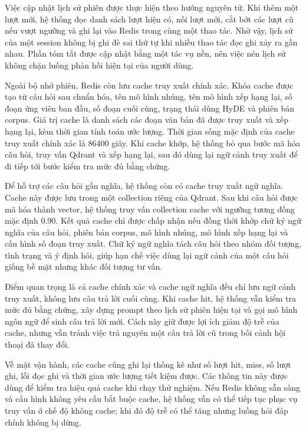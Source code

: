 \documentclass[a4paper,13pt,twoside]{report}
\begin{document}
Việc cập nhật lịch sử phiên được thực hiện theo hướng nguyên tử. Khi thêm một lượt mới, hệ thống đọc danh sách lượt hiện có, nối lượt mới, cắt bớt các lượt cũ nếu vượt ngưỡng và ghi lại vào Redis trong cùng một thao tác. Nhờ vậy, lịch sử của một session không bị ghi đè sai thứ tự khi nhiều thao tác đọc ghi xảy ra gần nhau. Phần tóm tắt được cập nhật bằng một tác vụ nền, nên việc nén lịch sử không chặn luồng phản hồi hiện tại của người dùng.

Ngoài bộ nhớ phiên, Redis còn lưu cache truy xuất chính xác. Khóa cache được tạo từ câu hỏi sau chuẩn hóa, tên mô hình nhúng, tên mô hình xếp hạng lại, số đoạn ứng viên ban đầu, số đoạn cuối cùng, trạng thái dùng HyDE và phiên bản corpus. Giá trị cache là danh sách các đoạn văn bản đã được truy xuất và xếp hạng lại, kèm thời gian tính toán ước lượng. Thời gian sống mặc định của cache truy xuất chính xác là 86400 giây. Khi cache khớp, hệ thống bỏ qua bước mã hóa câu hỏi, truy vấn Qdrant và xếp hạng lại, sau đó dùng lại ngữ cảnh truy xuất để đi tiếp tới bước kiểm tra mức đủ bằng chứng.

Để hỗ trợ các câu hỏi gần nghĩa, hệ thống còn có cache truy xuất ngữ nghĩa. Cache này được lưu trong một collection riêng của Qdrant. Sau khi câu hỏi được mã hóa thành vector, hệ thống truy vấn collection cache với ngưỡng tương đồng mặc định 0.90. Kết quả cache chỉ được chấp nhận nếu đồng thời khớp chữ ký ngữ nghĩa của câu hỏi, phiên bản corpus, mô hình nhúng, mô hình xếp hạng lại và cấu hình số đoạn truy xuất. Chữ ký ngữ nghĩa tách câu hỏi theo nhóm đối tượng, tình trạng và ý định hỏi, giúp hạn chế việc dùng lại ngữ cảnh của một câu hỏi giống bề mặt nhưng khác đối tượng tư vấn.

Điểm quan trọng là cả cache chính xác và cache ngữ nghĩa đều chỉ lưu ngữ cảnh truy xuất, không lưu câu trả lời cuối cùng. Khi cache hit, hệ thống vẫn kiểm tra mức đủ bằng chứng, xây dựng prompt theo lịch sử phiên hiện tại và gọi mô hình ngôn ngữ để sinh câu trả lời mới. Cách này giữ được lợi ích giảm độ trễ của cache, nhưng vẫn tránh việc trả nguyên một câu trả lời cũ trong bối cảnh hội thoại đã thay đổi.

Về mặt vận hành, các cache cũng ghi lại thống kê như số lượt hit, miss, số lượt ghi, lỗi đọc ghi và thời gian ước lượng tiết kiệm được. Các thông tin này được dùng để kiểm tra hiệu quả cache khi chạy thử nghiệm. Nếu Redis không sẵn sàng và cấu hình không yêu cầu bắt buộc cache, hệ thống vẫn có thể tiếp tục phục vụ truy vấn ở chế độ không cache; khi đó độ trễ có thể tăng nhưng luồng hỏi đáp chính không bị dừng.
\end{document}
